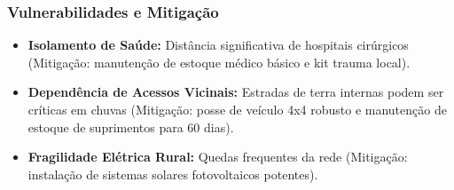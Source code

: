 \subsubsection{Vulnerabilidades e
Mitigação}

\begin{itemize}
\tightlist
\item
  \textbf{Isolamento de Saúde:} Distância significativa de hospitais
  cirúrgicos (Mitigação: manutenção de estoque médico básico e kit
  trauma local).
\item
  \textbf{Dependência de Acessos Vicinais:} Estradas de terra internas
  podem ser críticas em chuvas (Mitigação: posse de veículo 4x4 robusto
  e manutenção de estoque de suprimentos para 60 dias).
\item
  \textbf{Fragilidade Elétrica Rural:} Quedas frequentes da rede
  (Mitigação: instalação de sistemas solares fotovoltaicos potentes).
\end{itemize}

